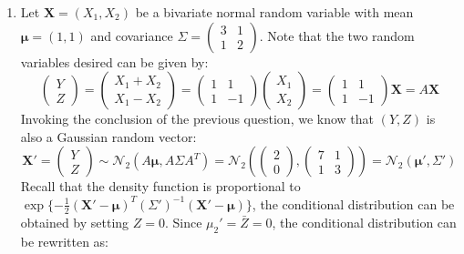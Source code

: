 \documentclass[a4paper, 10pt]{article}
\begin{document}
\begin{enumerate}[label=(\alph*)]
\item Let $\mathbf{X} = (X_1, X_2)$ be a bivariate normal random variable with mean $\mathbf{\mu} = (1, 1)$ and covariance $\Sigma = \begin{pmatrix}3 & 1 \\ 1 & 2\end{pmatrix}$. Note that the two random variables desired can be given by:
\begin{equation}
    \begin{pmatrix} Y \\ Z \end{pmatrix} = \begin{pmatrix} X_1 + X_2 \\ X_1 - X_2 \end{pmatrix} = 
    \begin{pmatrix} 1 & 1 \\ 1 & -1 \end{pmatrix} \begin{pmatrix} X_1 \\ X_2 \end{pmatrix} = \begin{pmatrix} 1 & 1 \\ 1 & -1 \end{pmatrix} \mathbf{X} = A \mathbf{X}
\end{equation}
Invoking the conclusion of the previous question, we know that $(Y,Z)$ is also a Gaussian random vector:
\begin{equation}
    \mathbf{X}' = \begin{pmatrix} Y \\ Z \end{pmatrix} \sim \mathcal{N}_2 \left(A \bm{\mu}, A\Sigma A^T\right) = \mathcal{N}_2 \left(\begin{pmatrix} 2 \\ 0 \end{pmatrix}, \begin{pmatrix} 7 & 1 \\ 1 & 3 \end{pmatrix}\right) = \mathcal{N}_2\left(\bm{\mu}', \Sigma'\right)
\end{equation}
Recall that the density function is proportional to $\exp\{-\frac{1}{2}(\mathbf{X}' - \bm{\mu})^T (\Sigma')^{-1} (\mathbf{X}' - \bm{\mu})\}$, the conditional distribution can be obtained by setting $Z=0$. Since $\mu_2' = \bar{Z} = 0$, the conditional distribution can be rewritten as:
\begin{equation}
    \begin{aligned}

\end{aligned}
\end{equation}
\end{enumerate}
\end{document}
